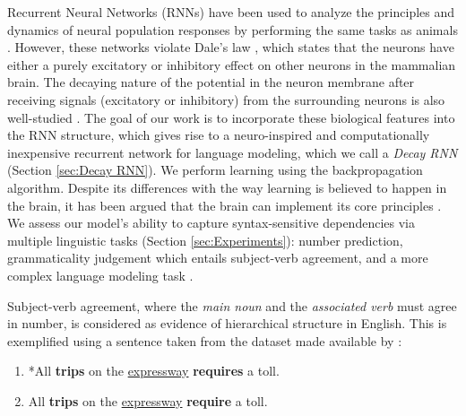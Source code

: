 \documentclass[11pt,a4paper]{article}
\begin{document}
Recurrent Neural Networks (RNNs) have been used to analyze the principles and dynamics of neural population responses by performing the same tasks as animals \cite{Mante2013}. However, these networks violate Dale's law \cite{dale1935pharmacology, strata1999dale}, which states that the neurons have either a purely excitatory or inhibitory effect on other neurons in the mammalian brain. The decaying nature of the potential in the neuron membrane after receiving signals (excitatory or inhibitory) from the surrounding neurons is also well-studied \cite{gluss1967model}. The goal of our work is to incorporate these biological features into the RNN structure, which gives rise to a neuro-inspired and computationally inexpensive recurrent network for language modeling, which we call a {\em Decay RNN} (Section \ref{sec:Decay RNN}). We perform learning using the backpropagation algorithm. Despite its differences with the way learning is believed to happen in the brain, it has been argued that the brain can implement its core principles \cite{hinton2007backpropagation, Lillicrap2020}.
We assess our model's ability to capture syntax-sensitive dependencies via multiple linguistic tasks (Section \ref{sec:Experiments}): number prediction, grammaticality judgement \cite{linzen2016assessing} which entails subject-verb agreement, and a more complex language modeling task \cite{marvin2018targeted}.

Subject-verb agreement, where the \textit{main noun} and the \textit{associated verb} must agree in number, is considered as evidence of hierarchical structure in English. This is exemplified using a sentence taken from the dataset made available by
\citet{linzen2016assessing}:

\begin{enumerate}
    \item *All \textbf{trips} on the \underline{expressway} \textbf{requires} a toll.
    \item All \textbf{trips} on the \underline{expressway} \textbf{require} a toll.
\end{enumerate}
\end{document}
